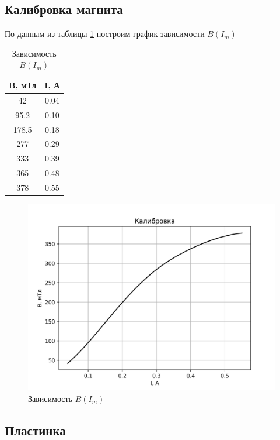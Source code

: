 \documentclass[a4paper, 12pt]{article}
\begin{document}
\subsection*{Калибровка магнита}
По данным из таблицы \ref{tab:cal} построим график зависимости $B(I_m)$
\begin{table}[]
	\centering
	\begin{tabular}{|c|c|}
	\hline
	\textbf{B, мТл} & \textbf{I, А} \\ \hline
	42              & 0.04          \\ \hline
	95.2            & 0.10          \\ \hline
	178.5           & 0.18          \\ \hline
	277             & 0.29          \\ \hline
	333             & 0.39          \\ \hline
	365             & 0.48          \\ \hline
	378             & 0.55          \\ \hline
	\end{tabular}
	\caption{Зависимость $B(I_m)$}
	\label{tab:cal}
\end{table}
\begin{figure}[H]
    \centering
    \includegraphics[width=1\textwidth]{calibration.png}
    \caption{Зависимость $B(I_m)$}
    \label{fig:cal}
\end{figure}

\subsection*{Пластинка}
\end{document}
